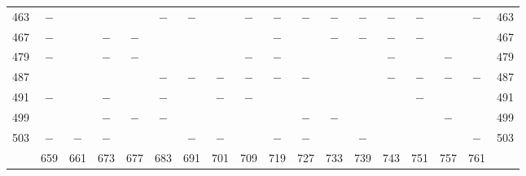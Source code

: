 \begin{center}
\begin{tabular}{r|c|c|c|c|c|c|c|c|c|c|c|c|c|c|c|c|r}
463 & $-$ &  &  &  & $-$ & $-$ &  & $-$ & $-$ & $-$ & $-$ & $-$ & $-$ & $-$ &  & $-$ & 463\\
467 & $-$ &  & $-$ & $-$ &  &  &  &  & $-$ &  & $-$ & $-$ & $-$ & $-$ &  &  & 467\\
479 & $-$ &  & $-$ & $-$ &  &  &  & $-$ & $-$ &  &  &  & $-$ &  & $-$ &  & 479\\
487 &  &  &  &  & $-$ & $-$ & $-$ & $-$ & $-$ & $-$ &  &  & $-$ & $-$ & $-$ & $-$ & 487\\
491 & $-$ &  & $-$ &  & $-$ &  & $-$ & $-$ &  &  &  &  &  & $-$ &  &  & 491\\
499 &  &  & $-$ & $-$ & $-$ &  &  &  &  & $-$ & $-$ &  &  &  & $-$ &  & 499\\
503 & $-$ & $-$ & $-$ &  &  & $-$ & $-$ &  & $-$ & $-$ &  & $-$ &  &  &  & $-$ & 503\\
\hline
 & 659 & 661 & 673 & 677 & 683 & 691 & 701 & 709 & 719 & 727 & 733 & 739 & 743 & 751 & 757 & 761 & \\
\hline
\end{tabular}\endgroup\end{center}

